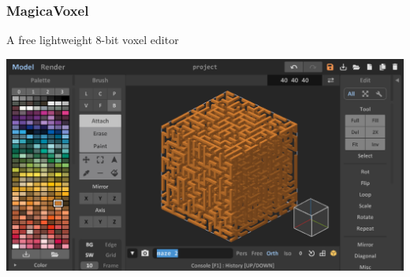 \documentclass[13.5pt,aspecratio=169, xcolor=dvipsnames]{beamer}
\begin{document}
\begin{frame}
    \onehalfspacing
    \frametitle{MagicaVoxel}
    \begin{minipage}{0.5\textwidth}
            \begin{block}{}
                A free lightweight 8-bit voxel editor 
            \end{block}

            \vspace{0.5em}
            \centering
            \includegraphics[width=\textwidth]{magica_commands.png}
    \end{minipage}
    \begin{minipage}{0.49\textwidth}
        \centering

\end{minipage}
\end{frame}
\end{document}
